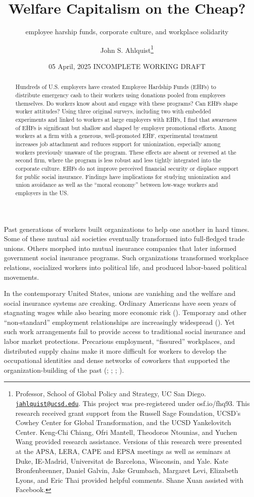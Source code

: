\documentclass[
  11pt,
  oneside]{article}
\title{Welfare Capitalism on the Cheap?}
\subtitle{employee harship funds, corporate culture, and workplace solidarity}
\author{John S. Ahlquist\footnote{Professor, School of Global Policy and Strategy, UC San Diego. \href{mailto:jahlquist@ucsd.edu}{\nolinkurl{jahlquist@ucsd.edu}}. This project was pre-registered under osf.io/fhq93. This research received grant support from the Russell Sage Foundation, UCSD's Cowhey Center for Global Transformation, and the UCSD Yankelovitch Center. Keng-Chi Chiang, Ofri Mantell, Theodoros Ntounias, and Yuchen Wang provided research assistance. Versions of this research were presented at the APSA, LERA, CAPE and EPSA meetings as well as seminars at Duke, IE-Madrid, Universitat de Barcelona, Wisconsin, and Yale. Kate Bronfenbrenner, Daniel Galvin, Jake Grumbach, Margaret Levi, Elizabeth Lyons, and Eric Thai provided helpful comments. Shane Xuan assisted with Facebook.}}
\date{05 April, 2025 INCOMPLETE WORKING DRAFT}
\begin{document}
\maketitle

\begin{abstract}
\begin{singlespace} 

Hundreds of U.S. employers have created Employee Hardship Funds (EHFs) to distribute emergency cash to their workers using donations pooled from employees themselves. Do workers know about and engage with these programs? Can EHFs shape worker attitudes? Using three original surveys, including two with embedded experiments and linked to workers at large employers with EHFs, I find that awareness of EHFs is significant but shallow and shaped by employer promotional efforts. Among workers at a firm with a generous, well-promoted EHF, experimental treatment increases job attachment and reduces support for unionization, especially among workers previously unaware of the program. These effects are absent or reversed at the second firm, where the program is less robust and less tightly integrated into the corporate culture. EHFs do not improve perceived financial security or displace support for public social insurance. Findings have implications for studying unionization and union avoidance as well as the ``moral economy'' between low-wage workers and employers in the US.\\


\end{singlespace}
\end{abstract}

Past generations of workers built organizations to help one another in hard times. Some of these mutual aid societies eventually transformed into full-fledged trade unions. Others morphed into mutual insurance companies that later informed government social insurance programs. Such organizations transformed workplace relations, socialized workers into political life, and produced labor-based political movements.

In the contemporary United States, unions are vanishing and the welfare and social insurance systems are creaking. Ordinary Americans have seen years of stagnating wages while also bearing more economic risk (). Temporary and other ``non-standard'' employment relationships are increasingly widespread (). Yet such work arrangements fail to provide access to traditional social insurance and labor market protections. Precarious employment, ``fissured'' workplaces, and distributed supply chains make it more difficult for workers to develop the occupational identities and dense networks of coworkers that supported the organization-building of the past (; ; ; ).
\end{document}
